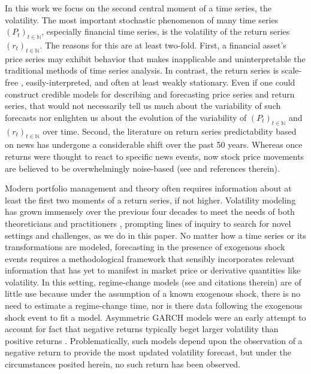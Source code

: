 \documentclass[11pt]{article}
\theoremstyle{definition}
\begin{document}
In this work we focus on the second central moment of a time series, the volatility.  The most important stochastic phenomenon of many time series $(P_{t})_{t\in\mathbb{N}}$, especially financial time series, is the volatility of the return series $(r_{t})_{t\in\mathbb{N}}$.  The reasons for this are at least two-fold.  First, a financial asset's price series may exhibit behavior that makes inapplicable and uninterpretable the traditional methods of time series analysis.  In contrast, the return series is scale-free \citep{tsay2005analysis}, easily-interpreted, and often at least weakly stationary.  Even if one could construct credible models for describing and forecasting price series and return series, that would not necessarily tell us much about the variability of such forecasts nor enlighten us about the evolution of the variability of $(P_{t})_{t\in\mathbb{N}}$ and $(r_{t})_{t\in\mathbb{N}}$ over time.  Second, the literature on return series predictability based on news has undergone a considerable shift over the past 50 years.  Whereas once returns were thought to react to specific news events, now stock price movements are believed to be overwhelmingly noise-based (see \citet{boudoukh2019information} and references therein).

Modern portfolio management and theory often requires information about at least the first two moments of a return series, if not higher.  Volatility modeling has grown immensely over the previous four decades to meet the needs of both theoreticians and practitioners \citep{engle2001good}, prompting lines of inquiry to search for novel settings and challenges, as we do in this paper.  No matter how a time series or its transformations are modeled, forecasting in the presence of exogenous shock events requires a methodological framework that sensibly incorporates relevant information that has yet to manifest in market price or derivative quantities like volatility.  In this setting, regime-change models (see \citet{bauwens2006regime} and citations therein) are of little use because under the assumption of a known exogenous shock, there is no need to estimate a regime-change time, nor is there data following the exogenous shock event to fit a model.  Asymmetric GARCH models were an early attempt to account for fact that negative returns typically beget larger volatility than positive returns \citep{hansen2012realized}.  Problematically, such models depend upon the observation of a negative return to provide the most updated volatility forecast, but under the circumstances posited herein, no such return has been observed.
\end{document}
